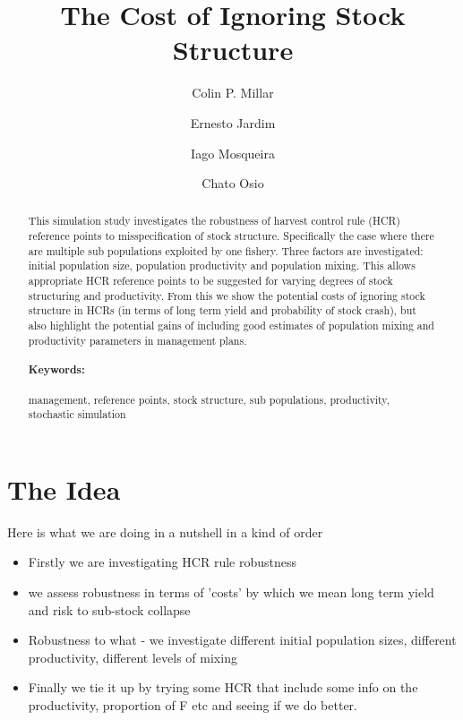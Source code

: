 \documentclass[a4paper,english]{article}
\begin{document}
\title{\textbf{\LARGE The Cost of Ignoring Stock Structure}}

\author[1,*]{Colin P. Millar}
\author[1]{Ernesto Jardim}
\author[1]{Iago Mosqueira}
\author[1]{Chato Osio}

\date{}

\maketitle


\begin{abstract}
  This simulation study investigates the robustness of harvest control rule (HCR) reference points to misspecification of stock structure. Specifically the case where there are multiple sub populations exploited by one fishery. Three factors are investigated: initial population size, population productivity and population mixing. This allows appropriate HCR reference points to be suggested for varying degrees of stock structuring and productivity. From this we show the potential costs of ignoring stock structure in HCRs (in terms of long term yield and probability of stock crash), but also highlight the potential gains of including good estimates of population mixing and productivity parameters in management plans. \\

\paragraph{Keywords:} management, reference points, stock structure, sub populations, productivity, stochastic simulation
\end{abstract}


\section*{The Idea}

Here is what we are doing in a nutshell in a kind of order
\begin{itemize}
  \item Firstly we are investigating HCR rule robustness
  \item we assess robustness in terms of 'costs' by which we mean long term yield and risk to sub-stock collapse
  \item Robustness to what - we investigate different initial population sizes, different productivity, different levels of mixing
  \item Finally we tie it up by trying some HCR that include some info on the productivity,  proportion of F etc and seeing if we do better.
\end{itemize}
\end{document}
